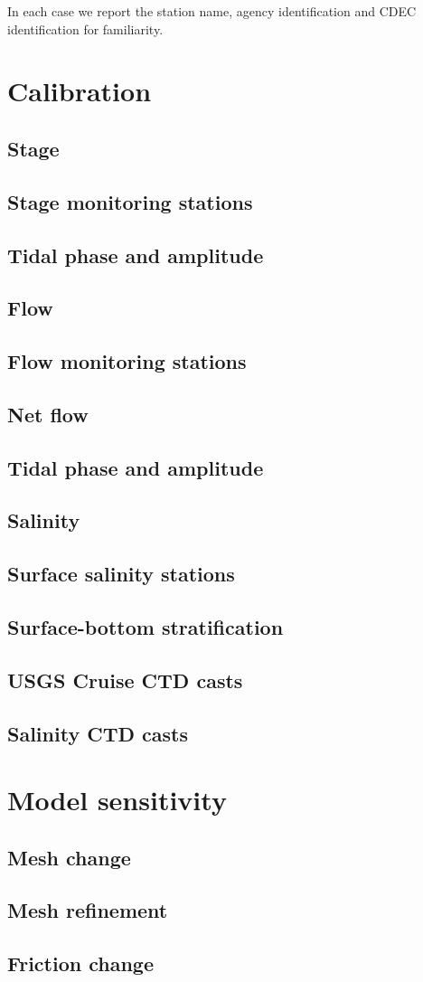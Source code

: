 In each case we report the station name, agency identification and CDEC identification for familiarity. 


\section{Calibration}
\subsection{Stage}
  \subsection{Stage monitoring stations}
	\subsection{Tidal phase and amplitude}
\subsection{Flow}
  \subsection{Flow monitoring stations}
	\subsection{Net flow}
	\subsection{Tidal phase and amplitude}
\subsection{Salinity}
  \subsection{Surface salinity stations}
  \subsection{Surface-bottom stratification}
	\subsection{USGS Cruise CTD casts}
\subsection{Salinity CTD casts}

\section{Model sensitivity}
  \subsection{Mesh change}
	\subsection{Mesh refinement}
	\subsection{Friction change}
